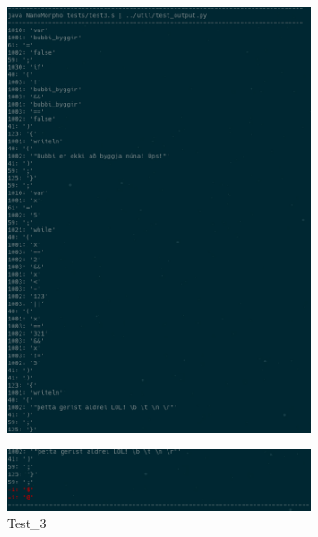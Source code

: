\documentclass{homework}
\begin{document}
\begin{answer}
\begin{figure}[H]
    \includegraphics[width=0.8\textwidth]{test3_a.png}
  \end{figure}
  \begin{figure}[H]
    \centering
    \caption*{Test\_3}
    \includegraphics[width=0.8\textwidth]{test3_b.png}
  \end{figure}
\end{answer}
\end{document}
